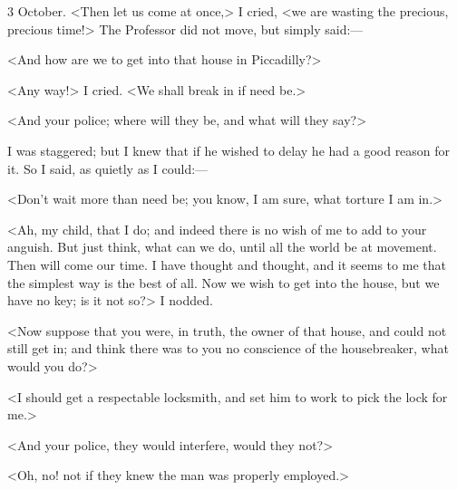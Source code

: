 \begin{diary}{3 October.}
<Then let us come at once,> I cried, <we are wasting the precious, precious time!> The Professor did not move, but simply said:—

<And how are we to get into that house in Piccadilly?>

<Any way!> I cried. <We shall break in if need be.>

<And your police; where will they be, and what will they say?>

I was staggered; but I knew that if he wished to delay he had a good reason for it. So I said, as quietly as I could:—

<Don't wait more than need be; you know, I am sure, what torture I am in.>

<Ah, my child, that I do; and indeed there is no wish of me to add to your anguish. But just think, what can we do, until all the world be at movement. Then will come our time. I have thought and thought, and it seems to me that the simplest way is the best of all. Now we wish to get into the house, but we have no key; is it not so?> I nodded.

<Now suppose that you were, in truth, the owner of that house, and could not still get in; and think there was to you no conscience of the housebreaker, what would you do?>

<I should get a respectable locksmith, and set him to work to pick the lock for me.>

<And your police, they would interfere, would they not?>

<Oh, no! not if they knew the man was properly employed.>


\end{diary}
